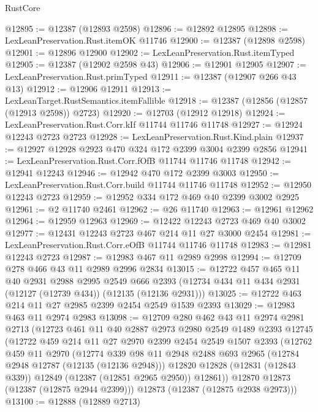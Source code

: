 \begin{lexlean}{RustCore}
\begin{coremodule}
@12895 := @12387 (@12893 @2598)
@12896 := @12892 @12895
@12898 := LexLeanPreservation.Rust.itemOK @11746
@12900 := @12387 (@12898 @2598)
@12901 := @12896 @12900
@12902 := LexLeanPreservation.Rust.itemTyped
@12905 := @12387 (@12902 @2598 @43)
@12906 := @12901 @12905
@12907 := LexLeanPreservation.Rust.primTyped
@12911 := @12387 (@12907 @266 @43 @13)
@12912 := @12906 @12911
@12913 := LexLeanTarget.RustSemantics.itemFallible
@12918 := @12387 (@12856 (@12857 (@12913 @2598)) @2723)
@12920 := @12703 (@12912 @12918)
@12924 := LexLeanPreservation.Rust.Corr.kIf @11744 @11746 @11748
@12927 := @12924 @12243 @2723 @2723
@12928 := LexLeanPreservation.Rust.Kind.plain
@12937 := @12927 @12928 @2923 @470 @324 @172 @2399 @3004 @2399 @2856
@12941 := LexLeanPreservation.Rust.Corr.fOfB @11744 @11746 @11748
@12942 := @12941 @12243
@12946 := @12942 @470 @172 @2399 @3003
@12950 := LexLeanPreservation.Rust.Corr.build @11744 @11746 @11748
@12952 := @12950 @12243 @2723
@12959 := @12952 @334 @172 @469 @40 @2399 @3002 @2925
@12961 := @2 @11740 @2461
@12962 := @26 @11740
@12963 := @12961 @12962
@12964 := @12959 @12963
@12969 := @12422 @12243 @2723 @469 @40 @3002
@12977 := @12431 @12243 @2723 @467 @214 @11 @27 @3000 @2454
@12981 := LexLeanPreservation.Rust.Corr.eOfB @11744 @11746 @11748
@12983 := @12981 @12243 @2723
@12987 := @12983 @467 @11 @2989 @2998
@12994 := @12709 @278 @466 @43 @11 @2989 @2996 @2834
@13015 := @12722
    @457
    @465
    @11
    @40
    @2931
    @2988
    @2995
    @2549
    @666
    @2393
    (@12734 @434 @11 @434 @2931 (@12127 (@12739 @434)) (@12135 (@12136 @2931)))
@13025 := @12722 @463 @214 @11 @27 @2985 @2399 @2454 @2549 @1539 @2393
@13029 := @12983 @463 @11 @2974 @2983
@13098 := @12709
    @280
    @462
    @43
    @11
    @2974
    @2981
    @2713
    (@12723
      @461
      @11
      @40
      @2887
      @2973
      @2980
      @2549
      @1489
      @2393
      @12745
      (@12722
        @459
        @214
        @11
        @27
        @2970
        @2399
        @2454
        @2549
        @1507
        @2393
        (@12762
          @459
          @11
          @2970
          (@12774
            @339
            @98
            @11
            @2948
            @2488
            @693
            @2965
            (@12784 @2948 @12787 (@12135 (@12136 @2948)))
            @12820
            @12828
            (@12831 (@12843 @339))
            @12849
            (@12387 (@12851 @2965 @2950))
            @12861))
        @12870
        @12873
        (@12387 (@12875 @2944 @2399)))
      @12873
      (@12387 (@12875 @2938 @2973)))
@13100 := @12888 (@12889 @2713)

\end{coremodule}
\end{lexlean}
